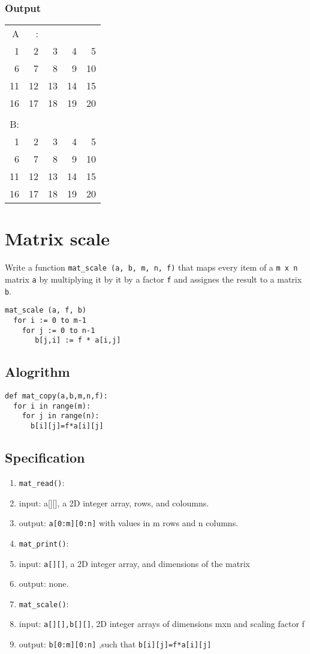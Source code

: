 \documentclass[11pt]{article}
\begin{document}
\subsubsection*{Output}
\label{sec-5-4-2}
\begin{center}
\begin{tabular}{rrrrr}
A & : &  &  & \\
1 & 2 & 3 & 4 & 5\\
6 & 7 & 8 & 9 & 10\\
11 & 12 & 13 & 14 & 15\\
16 & 17 & 18 & 19 & 20\\
 &  &  &  & \\
B: &  &  &  & \\
1 & 2 & 3 & 4 & 5\\
6 & 7 & 8 & 9 & 10\\
11 & 12 & 13 & 14 & 15\\
16 & 17 & 18 & 19 & 20\\
\end{tabular}
\end{center}

\section{Matrix scale}
\label{sec-6}
Write a function \texttt{mat\_scale (a, b, m, n, f)} that maps
every item of a \texttt{m x n} matrix \texttt{a} by multiplying it by it
by a factor \texttt{f} and assignes the result to a matrix \texttt{b}. 
\begin{verbatim}
mat_scale (a, f, b)
  for i := 0 to m-1
    for j := 0 to n-1
       b[j,i] := f * a[i,j]
\end{verbatim}
\linespread{1.2}
\subsection*{Alogrithm}
\label{sec-6-1}
\begin{verbatim}
def mat_copy(a,b,m,n,f):
  for i in range(m):
    for j in range(n):
      b[i][j]=f*a[i][j]
\end{verbatim}
\subsection*{Specification}
\label{sec-6-2}
\begin{enumerate}
\item \texttt{mat\_read()}:
\item input: a[][], a 2D integer array, rows, and coloumns.
\item output: \texttt{a[0:m][0:n]} with values in m rows and n columns.
\item \texttt{mat\_print()}:
\item input: \texttt{a[][]}, a 2D integer array, and dimensions of the matrix
\item output: none.
\item \texttt{mat\_scale()}:
\item input: \texttt{a[][],b[][]}, 2D integer arrays of dimensions mxn and scaling factor f
\item output: \texttt{b[0:m][0:n]} ,such that \texttt{b[i][j]=f*a[i][j]}
\end{enumerate}
\end{document}
